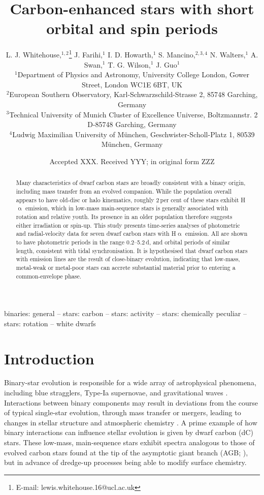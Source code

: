\documentclass[fleqn,usenatbib,useAMS]{mnras}
\title[Active dC stars with short orbital periods]{Carbon-enhanced stars with short orbital and spin periods}
\author[L.  J.  Whitehouse et al.]{L.  J.  Whitehouse,$^{1,2}$\thanks{E-mail: lewis.whitehouse.16@ucl.ac.uk}
J.  Farihi,$^{1}$
I.  D.  Howarth,$^{1}$
S.  Mancino,$^{2,3,4}$
N.  Walters,$^{1}$
A.  Swan,$^{1}$
\newauthor
T.  G.  Wilson,$^{1}$
J.  Guo$^{1}$
\\
$^{1}$Department of Physics and Astronomy, University College London, Gower Street, London WC1E 6BT, UK\\
$^{2}$European Southern Observatory, Karl-Schwarzschild-Strasse 2, 85748 Garching, Germany\\
$^{3}$Technical University of Munich Cluster of Excellence Universe, Boltzmannstr.  2 D-85748 Garching, Germany\\
$^{4}$Ludwig Maximilian University of M\"unchen, Geschwister-Scholl-Platz 1, 80539 M\"unchen, Germany
}
\date{Accepted XXX.  Received YYY; in original form ZZZ}
\begin{document}


\maketitle

\begin{abstract}
Many characteristics of dwarf carbon stars are broadly consistent with a binary origin, including mass transfer from an evolved companion.  While the population overall appears to have old-disc or halo kinematics, roughly 2\,per cent of these stars exhibit H$\upalpha$ emission, which in low-mass main-sequence stars is generally associated with rotation and relative youth.  Its presence in an older population therefore suggests either irradiation or spin-up.  This study presents time-series analyses of photometric and radial-velocity data for seven dwarf carbon stars with H$\upalpha$ emission.  All are shown to have photometric periods in the range 0.2--5.2\,d, and orbital periods of similar length, consistent with tidal synchronisation.  It is hypothesised that dwarf carbon stars with emission lines are the result of close-binary evolution, indicating that low-mass, metal-weak or metal-poor stars can accrete substantial material prior to entering a common-envelope phase.
\end{abstract}


\begin{keywords}
binaries: general -- stars: carbon -- stars: activity -- stars: chemically peculiar -- stars: rotation -- white dwarfs
\end{keywords}



\section{Introduction}


Binary-star evolution is responsible for a wide array of astrophysical phenomena, including blue stragglers, Type-Ia supernovae, and gravitational waves \citep{Blue_S,Webbink84,Grav_wav}.  Interactions between binary components may result in deviations from the course of typical single-star evolution, through mass transfer or mergers, leading to changes in stellar structure and atmospheric chemistry \citep{Hurley02,Merg}.  A prime example of how binary interactions can influence stellar evolution is given by dwarf carbon (dC) stars.  These low-mass, main-sequence stars exhibit spectra analogous to those of evolved carbon stars found at the tip of the asymptotic giant branch (AGB; \citealt{Dahn77}), but in advance of dredge-up processes being able to modify surface chemistry.
\end{document}
